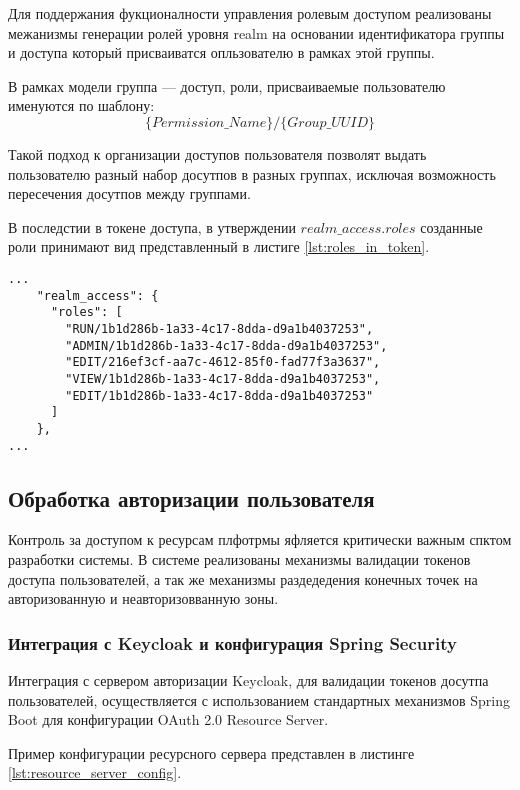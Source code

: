 Для поддержания фукционалности управления ролевым доступом реализованы межанизмы генерации ролей уровня realm на основании идентификатора группы и доступа который присваиватся опльзователю в рамках этой группы.

В рамках модели группа --- доступ, роли, присваиваемые пользователю именуются по шаблону:
$$
\{Permission\_Name\}/\{Group\_UUID\}
$$

Такой подход к организации доступов пользователя позволят выдать пользователю разный набор досутпов в разных группах, исключая возможность пересечения досутпов между группами.

В последстии в токене доступа, в утверждении $realm\_access.roles$ созданные роли принимают вид представленный в листиге \ref{lst:roles_in_token}.

\begin{lstlisting}[caption={Пример представления ролей пользователе в токене досутпа}, label=lst:roles_in_token]
...
    "realm_access": {
      "roles": [
        "RUN/1b1d286b-1a33-4c17-8dda-d9a1b4037253",
        "ADMIN/1b1d286b-1a33-4c17-8dda-d9a1b4037253",
        "EDIT/216ef3cf-aa7c-4612-85f0-fad77f3a3637",
        "VIEW/1b1d286b-1a33-4c17-8dda-d9a1b4037253",
        "EDIT/1b1d286b-1a33-4c17-8dda-d9a1b4037253"
      ]
    },
...
\end{lstlisting}

\subsection{Обработка авторизации пользователя}

Контроль за доступом к ресурсам плфотрмы яфляется критически важным спктом разработки системы. В системе реализованы механизмы валидации токенов доступа пользователей, а так же механизмы раздедедения конечных точек на авторизованную и неавторизовванную зоны.

\subsubsection{Интеграция с Keycloak и конфигурация Spring Security}

Интеграция с сервером авторизации Keycloak, для валидации токенов досутпа пользователей, осуществляется с использованием стандартных механизмов Spring Boot для конфигурации OAuth 2.0 Resource Server\cite{ferry2015security}.

Пример конфигурации ресурсного сервера представлен в листинге \ref{lst:resource_server_config}.

